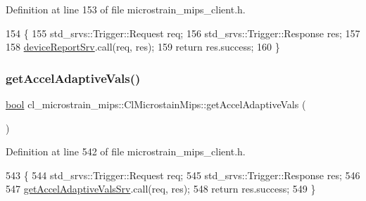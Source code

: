 Definition at line 153 of file microstrain\+\_\+mips\+\_\+client.\+h.


\begin{DoxyCode}
154     \{
155         std\_srvs::Trigger::Request req;
156         std\_srvs::Trigger::Response res;
157 
158         \hyperlink{classcl__microstrain__mips_1_1ClMicrostainMips_a905c9403005198bb4dd62918721b7d10}{deviceReportSrv}.call(req, res);
159         \textcolor{keywordflow}{return} res.success;
160     \}
\end{DoxyCode}
\mbox{\label{classcl__microstrain__mips_1_1ClMicrostainMips_aac0a271bd226038aca61077c08c6427b}} 
\subsubsection{\texorpdfstring{get\+Accel\+Adaptive\+Vals()}{getAccelAdaptiveVals()}}
{\footnotesize\ttfamily \hyperlink{classbool}{bool} cl\+\_\+microstrain\+\_\+mips\+::\+Cl\+Microstain\+Mips\+::get\+Accel\+Adaptive\+Vals (\begin{DoxyParamCaption}{ }\end{DoxyParamCaption})\hspace{0.3cm}{\ttfamily [inline]}}



Definition at line 542 of file microstrain\+\_\+mips\+\_\+client.\+h.


\begin{DoxyCode}
543     \{
544         std\_srvs::Trigger::Request req;
545         std\_srvs::Trigger::Response res;
546 
547         \hyperlink{classcl__microstrain__mips_1_1ClMicrostainMips_a828f3b0adbfb1e6082fcaa1ce22928c0}{getAccelAdaptiveValsSrv}.call(req, res);
548         \textcolor{keywordflow}{return} res.success;
549     \}
\end{DoxyCode}
\mbox{\label{classcl__microstrain__mips_1_1ClMicrostainMips_a97ef55f8b10be52f44ae585ccd4e7db9}} 
